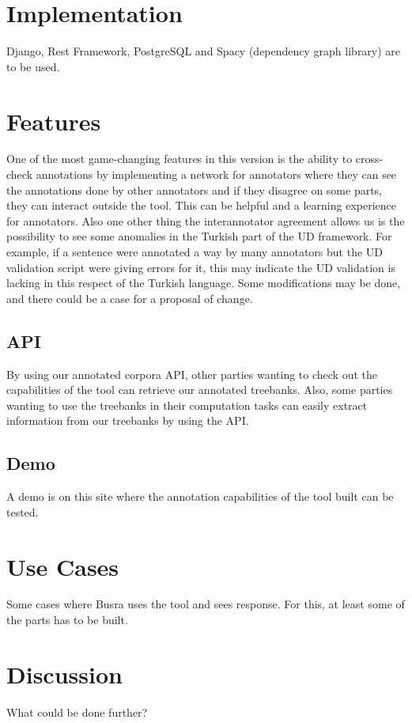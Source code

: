 \documentclass[
]{ceurart}
\begin{document}
\section{Implementation}

Django, Rest Framework, PostgreSQL and Spacy (dependency graph library) are to be used.

\section{Features}

One of the most game-changing features in this version is the ability to cross-check annotations by implementing a network for annotators where they can see the annotations done by other annotators and if they disagree on some parts, they can interact outside the tool. This can be helpful and a learning experience for annotators.
Also one other thing the interannotator agreement allows us is the possibility to see some anomalies in the Turkish part of the UD framework. For example, if a sentence were annotated a way by many annotators but the UD validation script were giving errors for it, this may indicate the UD validation is lacking in this respect of the Turkish language. Some modifications may be done, and there could be a case for a proposal of change.

\subsection{API}

By using our annotated corpora API, other parties wanting to check out the capabilities of the tool can retrieve our annotated treebanks. Also, some parties wanting to use the treebanks in their computation tasks can easily extract information from our treebanks by using the API.

\subsection{Demo}

A demo is on this site where the annotation capabilities of the tool built can be tested.

\section{Use Cases}

Some cases where Busra uses the tool and sees response. For this, at least some of the parts has to be built.

\section{Discussion}

What could be done further?


\end{document}

